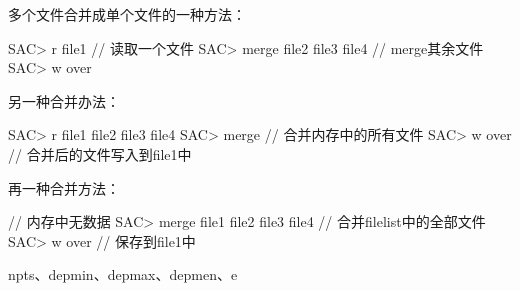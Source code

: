 多个文件合并成单个文件的一种方法：
\begin{SACCode}
SAC> r file1                        // 读取一个文件
SAC> merge file2 file3 file4        // merge其余文件
SAC> w over
\end{SACCode}

另一种合并办法：
\begin{SACCode}
SAC> r file1 file2 file3 file4
SAC> merge                      // 合并内存中的所有文件
SAC> w over                     // 合并后的文件写入到file1中
\end{SACCode}

再一种合并方法：
\begin{SACCode}                     // 内存中无数据
SAC> merge file1 file2 file3 file4  // 合并filelist中的全部文件
SAC> w over                         // 保存到file1中
\end{SACCode}

npts、depmin、depmax、depmen、e
